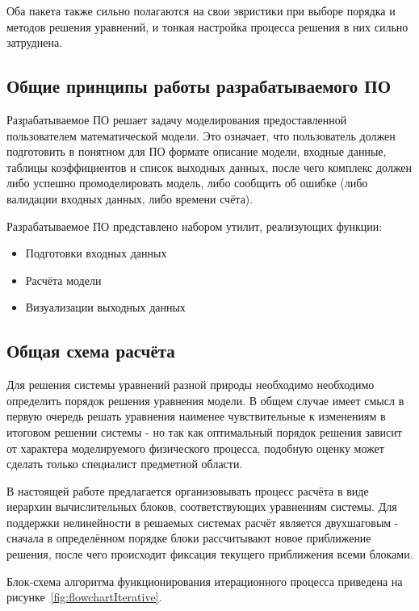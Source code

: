Оба пакета также сильно полагаются на свои эвристики при выборе порядка и 
методов решения уравнений, и тонкая настройка процесса решения в них сильно 
затруднена.

\subsection{Общие принципы работы разрабатываемого ПО}
Разрабатываемое ПО решает задачу моделирования предоставленной пользователем 
математической модели. Это означает, что пользователь должен подготовить в 
понятном для ПО формате описание модели, входные данные, таблицы коэффициентов 
и список выходных данных, после чего комплекс должен либо успешно 
промоделировать модель, либо сообщить об ошибке (либо валидации входных данных, 
либо времени счёта).

Разрабатываемое ПО представлено набором утилит, реализующих функции:

\begin{itemize}
    \item Подготовки входных данных
    \item Расчёта модели
    \item Визуализации выходных данных
\end{itemize}

\subsection{Общая схема расчёта}
Для решения системы уравнений разной природы необходимо необходимо определить 
порядок решения уравнения модели. 
В общем случае имеет смысл в первую очередь решать уравнения наименее 
чувствительные к изменениям в итоговом решении системы - но так как оптимальный 
порядок решения зависит от характера моделируемого физического процесса, 
подобную оценку может сделать только специалист предметной области.

В настоящей работе предлагается организовывать процесс расчёта в виде иерархии 
вычислительных блоков, соответствующих уравнениям системы.
Для поддержки нелинейности в решаемых системах расчёт является двухшаговым - 
сначала в определённом порядке блоки рассчитывают новое приближение решения, 
после чего происходит фиксация текущего приближения всеми блоками. 

Блок-схема алгоритма функционирования итерационного процесса приведена на 
рисунке~\ref{fig:flowchartIterative}.

